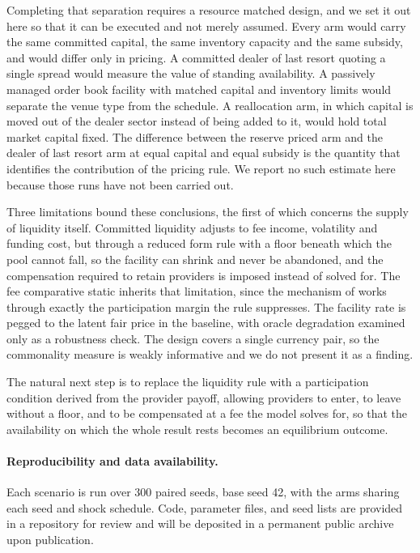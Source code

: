 \documentclass[a4paper,fleqn]{cas-sc}
\begin{document}
Completing that separation requires a resource matched design, and we set it out here so that it can be executed and not merely assumed. Every arm would carry the same committed capital, the same inventory capacity and the same subsidy, and would differ only in pricing. A committed dealer of last resort quoting a single spread would measure the value of standing availability. A passively managed order book facility with matched capital and inventory limits would separate the venue type from the schedule. A reallocation arm, in which capital is moved out of the dealer sector instead of being added to it, would hold total market capital fixed. The difference between the reserve priced arm and the dealer of last resort arm at equal capital and equal subsidy is the quantity that identifies the contribution of the pricing rule. We report no such estimate here because those runs have not been carried out.

Three limitations bound these conclusions, the first of which concerns the supply of liquidity itself. Committed liquidity adjusts to fee income, volatility and funding cost, but through a reduced form rule with a floor beneath which the pool cannot fall, so the facility can shrink and never be abandoned, and the compensation required to retain providers is imposed instead of solved for. The fee comparative static inherits that limitation, since the mechanism of \citet{hasbrouck2024dex} works through exactly the participation margin the rule suppresses. The facility rate is pegged to the latent fair price in the baseline, with oracle degradation examined only as a robustness check. The design covers a single currency pair, so the commonality measure is weakly informative and we do not present it as a finding.

The natural next step is to replace the liquidity rule with a participation condition derived from the provider payoff, allowing providers to enter, to leave without a floor, and to be compensated at a fee the model solves for, so that the availability on which the whole result rests becomes an equilibrium outcome.

\paragraph{Reproducibility and data availability.} Each scenario is run over 300 paired seeds, base seed 42, with the arms sharing each seed and shock schedule. Code, parameter files, and seed lists are provided in a repository for review and will be deposited in a permanent public archive upon publication.
\end{document}
